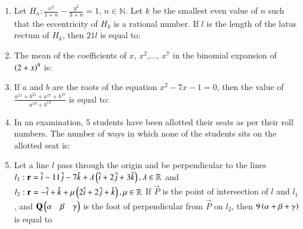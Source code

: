 \documentclass[journal]{IEEEtran}
\begin{document}
\begin{enumerate}
	\item 
	Let $H_n:\frac{x^2}{1+n} - \frac{y^2}{3+n} = 1$, $n \in \mathbb{N}$. Let $k$ be the smallest even value of $n$ such that the eccentricity of $H_k$ is a rational number. If $l$ is the length of the latus rectum of $H_k$, then $21l$ is equal to:

	\item
	The mean of the coefficients of $x$, $x^2$,..., $x^7$ in the binomial expansion of $\left(2 + x\right)^{9}$ is:

	\item
	If $a$ and $b$ are the roots of the equation $x^{2} - 7x - 1 = 0$, then the value of $\frac{a^{21} + b^{21} + a^{17} + b^{17}}{a^{19} + b^{19}}$ is equal to:

	\item
	In an examination, 5 students have been allotted their seats as per their roll numbers. The number of ways in which none of the students sits on the allotted seat is:

	\item
Let a line $l$ pass through the origin and be perpendicular to the lines \\
	$l_1 : \mathbf{r} = \hat{i} - 11\hat{j} - 7\hat{k} + \lambda\left(\hat{i} +2\hat{j} + 3\hat{k}\right), \lambda \in \mathbb{R}$ and \\
	$l_2 : \mathbf{r} = -\hat{i} + \hat{k} + \mu\left(2\hat{i} +2\hat{j} + \hat{k}\right), \mu \in \mathbb{R}$
	If $\vec{P}$ is the point of intersection of $l$ and $l_1$, and $\mathbf{Q} \begin{pmatrix}\alpha & \beta & \gamma\end{pmatrix}$ is the foot of perpendicular from $\vec{P}$ on $l_2$, then $9\left(\alpha+\beta+\gamma\right)$ is equal to
 \end{enumerate}
 
\end{document}
